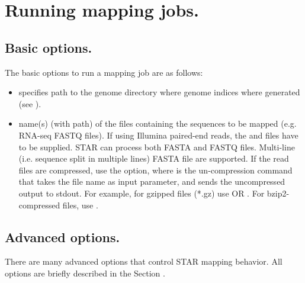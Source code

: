 \documentclass[12pt]{article}
\begin{document}
\section{Running mapping jobs.}\label{Running_mapping_jobs}
\subsection{Basic options.}
The basic options to run a mapping job are as follows:

\begin{itemize}
\item[]

 specifies path to the genome directory where genome indices where generated (see ).

\item[]
 name(s) (with path) of the files containing the sequences to be mapped (e.g. RNA-seq FASTQ files). If using Illumina paired-end reads, the  and  files have to be supplied. STAR can process both FASTA and FASTQ files. Multi-line (i.e. sequence split in multiple lines) FASTA file are supported. If the read files are compressed, use the   option, where  is the un-compression command that takes the file name as input parameter, and sends the uncompressed output to stdout. For example, for gzipped files (*.gz) use
OR
.
For bzip2-compressed files, use
.
\end{itemize}

\subsection{Advanced options.}
There are many advanced options that control STAR mapping behavior. All options are briefly described in the Section . 
\end{document}
